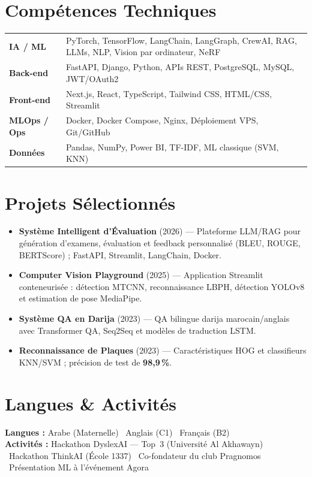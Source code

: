 \documentclass[10pt,a4paper]{article}
\begin{document}
\section*{Compétences Techniques}
\begin{tabularx}{\textwidth}{@{}>{\bfseries}l@{\hspace{0.6em}}X@{}}
IA / ML     & PyTorch, TensorFlow, LangChain, LangGraph, CrewAI, RAG, LLMs, NLP, Vision par ordinateur, NeRF \\
Back-end    & FastAPI, Django, Python, APIs REST, PostgreSQL, MySQL, JWT/OAuth2 \\
Front-end   & Next.js, React, TypeScript, Tailwind CSS, HTML/CSS, Streamlit \\
MLOps / Ops & Docker, Docker Compose, Nginx, Déploiement VPS, Git/GitHub \\
Données     & Pandas, NumPy, Power BI, TF-IDF, ML classique (SVM, KNN) \\
\end{tabularx}

\section*{Projets Sélectionnés}
\begin{itemize}
    \item \textbf{Système Intelligent d'Évaluation} (2026) --- Plateforme LLM/RAG pour génération d'examens, évaluation et feedback personnalisé (BLEU, ROUGE, BERTScore) ; FastAPI, Streamlit, LangChain, Docker.
    \item \textbf{Computer Vision Playground} (2025) --- Application Streamlit conteneurisée : détection MTCNN, reconnaissance LBPH, détection YOLOv8 et estimation de pose MediaPipe.
    \item \textbf{Système QA en Darija} (2023) --- QA bilingue darija marocain/anglais avec Transformer QA, Seq2Seq et modèles de traduction LSTM.
    \item \textbf{Reconnaissance de Plaques} (2023) --- Caractéristiques HOG et classifieurs KNN/SVM ; précision de test de \textbf{98,9\,\%}.
\end{itemize}

\section*{Langues \& Activités}
\textbf{Langues :} Arabe (Maternelle) \textbullet\ Anglais (C1) \textbullet\ Français (B2)\\[2pt]
\textbf{Activités :} Hackathon DyslexAI --- Top~3 (Université Al Akhawayn) \textbullet\
Hackathon ThinkAI (École 1337) \textbullet\
Co-fondateur du club Pragnomos \textbullet\
Présentation ML à l'événement Agora
\end{document}
